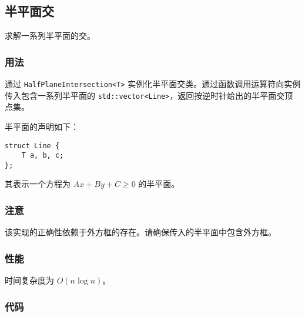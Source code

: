 \subsection{半平面交}

求解一系列半平面的交。

\subsubsection{用法}

通过 \lstinline{HalfPlaneIntersection<T>} 实例化半平面交类。通过函数调用运算符向实例传入包含一系列半平面的 \lstinline{std::vector<Line>}，返回按逆时针给出的半平面交顶点集。

半平面的声明如下：

\begin{lstlisting}
struct Line {
    T a, b, c;
};
\end{lstlisting}

其表示一个方程为 $Ax + By + C \ge 0$ 的半平面。

\subsubsection{注意}

该实现的正确性依赖于外方框的存在。请确保传入的半平面中包含外方框。

\subsubsection{性能}

时间复杂度为 $O(n \log n)$。

\subsubsection{代码}


